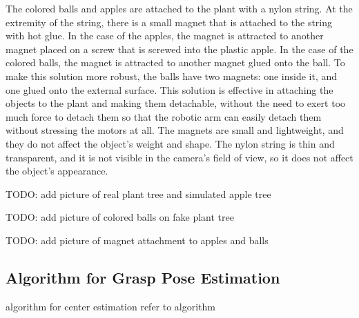 The colored balls and apples are attached to the plant with a nylon string. At the extremity of the string, there is a small
magnet that is attached to the string with hot glue. In the case of the apples, the magnet is attracted to another magnet
placed on a screw that is screwed into the plastic apple. In the case of the colored balls, the magnet is attracted
to another magnet glued onto the ball. To make this solution more robust, the balls have two magnets: one inside it,
and one glued onto the external surface.
This solution is effective in attaching the objects to the plant and making them detachable, 
without the need to exert too much force to detach them so that the robotic arm can easily detach them
without stressing the motors at all. The magnets are small and lightweight, and they do not affect the object's weight and shape.
The nylon string is thin and transparent, and it is not visible in the camera's field of view, 
so it does not affect the object's appearance.

TODO: add picture of real plant tree and simulated apple tree

TODO: add picture of colored balls on fake plant tree

TODO: add picture of magnet attachment to apples and balls

\subsection{Algorithm for Grasp Pose Estimation}

algorithm for center estimation
refer to algorithm 


